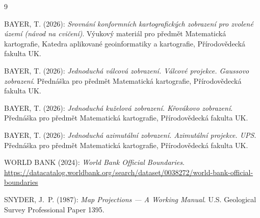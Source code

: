 \documentclass[11pt, a4paper]{article}
\begin{document}
\newpage
\renewcommand{\refname}{Zdroje}
\begin{thebibliography}{9}

 BAYER, T. (2026): \textit{Srovnání konformních kartografických zobrazení pro zvolené území (návod na cvičení)}. Výukový materiál pro předmět Matematická kartografie, Katedra aplikované geoinformatiky a kartografie, Přírodovědecká fakulta UK.

 BAYER, T. (2026): \textit{Jednoduchá válcová zobrazení. Válcové projekce. Gaussovo zobrazení}. Přednáška pro předmět Matematická kartografie, Přírodovědecká fakulta UK.

 BAYER, T. (2026): \textit{Jednoduchá kuželová zobrazení. Křovákovo zobrazení}. Přednáška pro předmět Matematická kartografie, Přírodovědecká fakulta UK.

 BAYER, T. (2026): \textit{Jednoduchá azimutální zobrazení. Azimutální projekce. UPS}. Přednáška pro předmět Matematická kartografie, Přírodovědecká fakulta UK.

 WORLD BANK (2024): \textit{World Bank Official Boundaries}. \url{https://datacatalog.worldbank.org/search/dataset/0038272/world-bank-official-boundaries}

 SNYDER, J.~P. (1987): \textit{Map Projections --- A Working Manual}. U.S. Geological Survey Professional Paper 1395.

\end{thebibliography}
\end{document}
